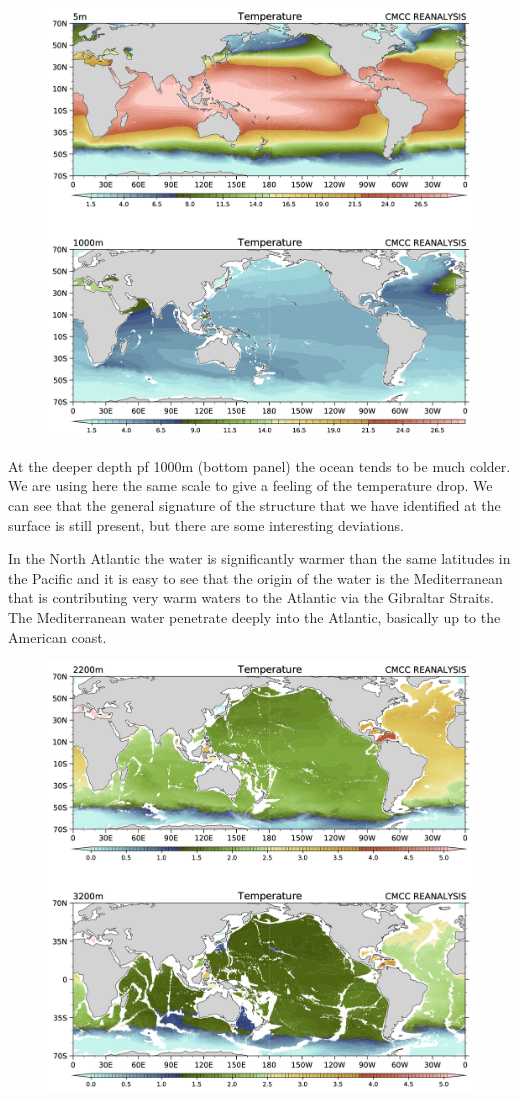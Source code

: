 \begin{figure}
\centering
\includegraphics[width = .7 \textwidth]{figs/GD/Temp5-1000.png}
\caption{} \label{fig:}
\end{figure}

At the deeper depth pf 1000m (bottom panel) the ocean tends to be much
colder. We are using here the same scale to give a feeling of the
temperature drop. We can see that the general signature of the structure
that we have identified at the surface is still present, but there are
some interesting deviations.

In the North Atlantic the water is significantly warmer than the same
latitudes in the Pacific and it is easy to see that the origin of the
water is the Mediterranean that is contributing very warm waters to the
Atlantic via the Gibraltar Straits. The Mediterranean water penetrate
deeply into the Atlantic, basically up to the American coast.

\begin{figure}
\centering
\includegraphics[width = .7 \textwidth]{figs/GD/Temp2200-3200.png}
\caption{} \label{fig:}
\end{figure}

